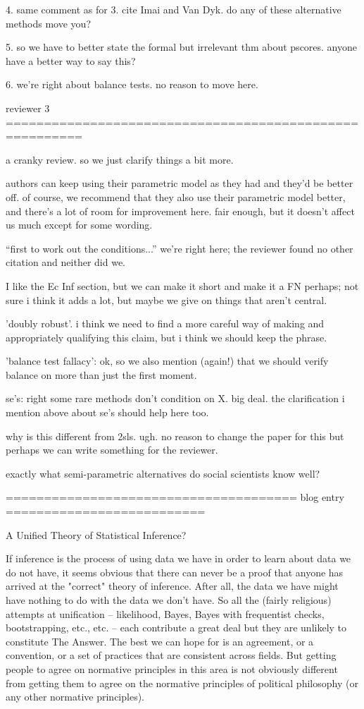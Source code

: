 4.  same comment as for 3.  cite Imai and Van Dyk.  do any of these
alternative methods move you?

5. so we have to better state the formal but irrelevant thm about
pscores.  anyone have a better way to say this?

6.  we're right about balance tests.  no reason to move here.

reviewer 3 ========================================================

a cranky review.  so we just clarify things a bit more.

authors can keep using their parametric model as they had and they'd
be better off.  of course, we recommend that they also use their
parametric model better, and there's a lot of room for improvement
here.  fair enough, but it doesn't affect us much except for some
wording.

``first to work out the conditions...''  we're right here; the
reviewer found no other citation and neither did we.

I like the Ec Inf section, but we can make it short and make it a FN
perhaps; not sure i think it adds a lot, but maybe we give on things
that aren't central.

'doubly robust'.  i think we need to find a more careful way of making
and appropriately qualifying this claim, but i think we should keep
the phrase.
 
'balance test fallacy':  ok, so we also mention (again!) that we
should verify balance on more than just the first moment.

se's:  right some rare methods don't condition on X.  big deal.  the
clarification i mention above about se's should help here too.

why is this different from 2sls.  ugh.  no reason to change the paper
for this but perhaps we can write something for the reviewer.

exactly what semi-parametric alternatives do social scientists know
well?


====================================== blog entry ==========================

A Unified Theory of Statistical Inference?

If inference is the process of using data we have in order to learn
about data we do not have, it seems obvious that there can never be a
proof that anyone has arrived at the "correct" theory of inference.
After all, the data we have might have nothing to do with the data we
don't have. So all the (fairly religious) attempts at unification --
likelihood, Bayes, Bayes with frequentist checks, bootstrapping, etc.,
etc. -- each contribute a great deal but they are unlikely to
constitute The Answer. The best we can hope for is an agreement, or a
convention, or a set of practices that are consistent across fields.
But getting people to agree on normative principles in this area is
not obviously different from getting them to agree on the normative
principles of political philosophy (or any other normative
principles).

